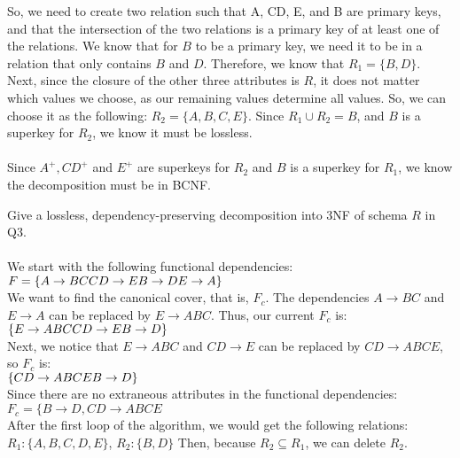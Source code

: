 \documentclass[a4 paper]{article}
\begin{document}
So, we need to create two relation such that A, CD, E, and B are primary keys, and that the intersection of the two relations is a primary key of at least one of the relations. We know that for $B$ to be a primary key, we need it to be in a relation that only contains $B$ and $D$. Therefore, we know that $R_1=\{B,D\}$. Next, since the closure of the other three attributes is $R$, it does not matter which values we choose, as our remaining values determine all values. So, we can choose it as the following: $R_2=\{A,B,C,E\}$. Since $R_1\cup R_2={B}$, and $B$ is a superkey for $R_2$, we know it must be lossless.\\\\
Since $A^+, CD^+$ and $E^+$ are superkeys for $R_2$ and $B$ is a superkey for $R_1$, we know the decomposition must be in BCNF.






Give a lossless, dependency-preserving decomposition into 3NF of schema $R$ in Q3.\\\\

We start with the following functional dependencies:
\\$F = \{
\\A \rightarrow BC\\
CD \rightarrow E\\
B \rightarrow D\\
E \rightarrow A\}$\\
We want to find the canonical cover, that is, $F_c$.
The dependencies $A\rightarrow BC$ and $E\rightarrow A$ can be replaced by $E\rightarrow ABC$. Thus, our current $F_c$ is:\\
$\{
\\E \rightarrow ABC\\
CD \rightarrow E\\
B \rightarrow D\}$\\

Next, we notice that $E \rightarrow ABC$ and $CD \rightarrow E$ can be replaced by $CD\rightarrow ABCE$, so $F_c$ is:\\
$\{
\\CD \rightarrow ABCE\\
B \rightarrow D\}$\\


Since there are no extraneous attributes in the functional dependencies:
$F_c=\{B\rightarrow D, CD\rightarrow ABCE$\\
After the first loop of the algorithm, we would get the following relations:\\
$R_1:\{A,B,C,D,E\}$, $R_2:\{B,D\}$
Then, because $R_2\subseteq R_1$, we can delete $R_2$.
\end{document}

